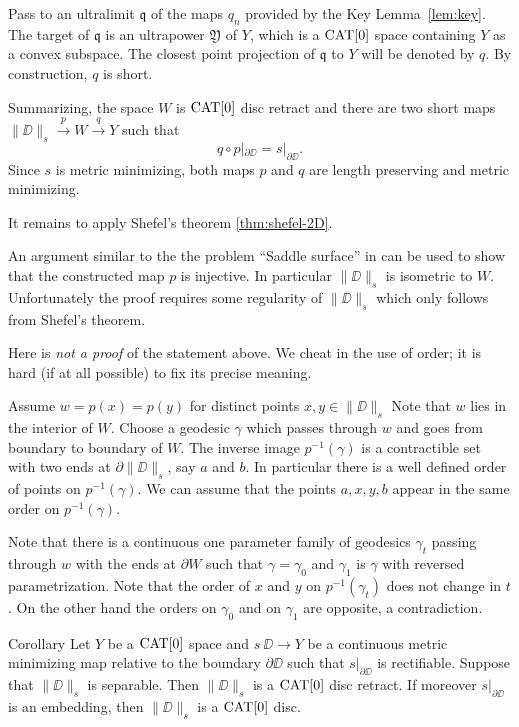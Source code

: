\documentclass[a4paper,10pt]{amsart}
\begin{document}
Pass to an ultralimit $\mathfrak{q}$ of the maps $q_n$ provided by the Key Lemma~\ref{lem:key}. The target of $\mathfrak{q}$ is an ultrapower  $\mathfrak{Y}$ of $Y$,
which is a $\mathop{\rm CAT}\nolimits[0]$ space containing $Y$ as a convex subspace.
The closest point projection of $\mathfrak{q}$ to $Y$ will be denoted by $q$.
By construction, $q$ is short.


Summarizing, the space $W$ is $\mathop{\rm CAT}\nolimits[0]$ disc retract and
 there are two short maps 
$\|\DD\|_s\xrightarrow{p} W \xrightarrow{q} Y$
such that 
\[q\circ p|_{\partial\DD}=s|_{\partial\DD}.\] 
Since $s$ is metric minimizing, both maps $p$ and $q$ are length preserving and metric minimizing.

It remains to apply Shefel's theorem \ref{thm:shefel-2D}.


\qeds



 An argument similar to the the problem ``Saddle surface'' in \cite{petrunin-orthodox}
can be used to show that the constructed map $p$ 
is injective. 
In particular $\|\DD\|_s$ is isometric to $W$.
Unfortunately the proof requires some regularity of $\|\DD\|_s$ which only follows from Shefel's theorem. 

Here is \emph{not a proof} of the statement above.
We cheat in the use of order; 
it is hard (if at all possible) to fix its precise meaning.

 Assume  $w=p(x)=p(y)$ for distinct points $x,y\in\|\DD\|_s$
Note that  $w$ lies in the interior of $W$.
Choose a geodesic $\gamma$ which passes through $w$ and goes 
from boundary to boundary of $W$.
The inverse image $p^{-1}(\gamma)$ is a contractible set with two ends at $\partial\|\DD\|_s$, say $a$ and $b$.
In particular there is a well defined order of  points on $p^{-1}(\gamma)$.
We can assume that the points $a,x,y,b$ appear in the same order on $p^{-1}(\gamma)$. 

Note that there is a continuous one parameter family of geodesics $\gamma_t$ passing through $w$ with the ends at $\partial W$
such that $\gamma=\gamma_0$ and $\gamma_1$ is $\gamma$ with reversed parametrization.
Note that the order of $x$ and $y$ on $p^{-1}(\gamma_t)$ does not change in $t$.
On the other hand the orders on $\gamma_0$ and on $\gamma_1$ are opposite, a contradiction.\qeds 

\begin{thm}{Corollary}\label{cor:main}
Let $Y$ be a $\mathop{\rm CAT}\nolimits[0]$ space 
and $s\:\DD\to Y$ be a continuous metric minimizing map relative to the boundary $\partial\DD$ such that $s|_{\partial\DD}$ is rectifiable.
Suppose that $\|\DD\|_s$  is separable. Then $\|\DD\|_s$ is a $\mathop{\rm CAT}\nolimits[0]$ disc retract. If moreover  $s|_{\partial\DD}$ is an embedding,
then $\|\DD\|_s$ is a $\mathop{\rm CAT}\nolimits[0]$ disc.
\end{thm}
\end{document}
